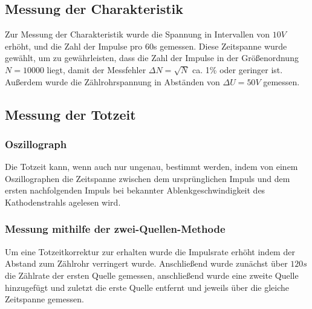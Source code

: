 \documentclass{scrartcl}
\begin{document}
\subsection{Messung der Charakteristik}
Zur Messung der Charakteristik wurde die Spannung in Intervallen von $10V$ erhöht, und die Zahl der Impulse pro 60s gemessen. Diese Zeitspanne wurde gewählt, um zu gewährleisten, dass die Zahl der Impulse in der Größenordnung $N=10000$  liegt, damit der Messfehler $\Delta N=\sqrt{N}$ ca. 1\% oder geringer ist. Außerdem wurde die Zählrohrspannung in Abständen von $\Delta U=50V$ gemessen.
\subsection{Messung der Totzeit}
\subsubsection{Oszillograph}
Die Totzeit kann, wenn auch nur ungenau, bestimmt werden, indem von einem Oszillographen die Zeitspanne zwischen dem ursprünglichen Impuls und dem ersten nachfolgenden Impuls bei bekannter Ablenkgeschwindigkeit des Kathodenstrahls agelesen wird.
\subsubsection{Messung mithilfe der zwei-Quellen-Methode}
Um eine Totzeitkorrektur zur erhalten wurde die Impulsrate erhöht indem der Abstand zum Zählrohr verringert wurde. Anschließend wurde zunächst über $120s$  die Zählrate der ersten Quelle gemessen, anschließend wurde eine zweite Quelle hinzugefügt und zuletzt die erste Quelle entfernt und jeweils über die gleiche Zeitspanne gemessen.
\end{document}
